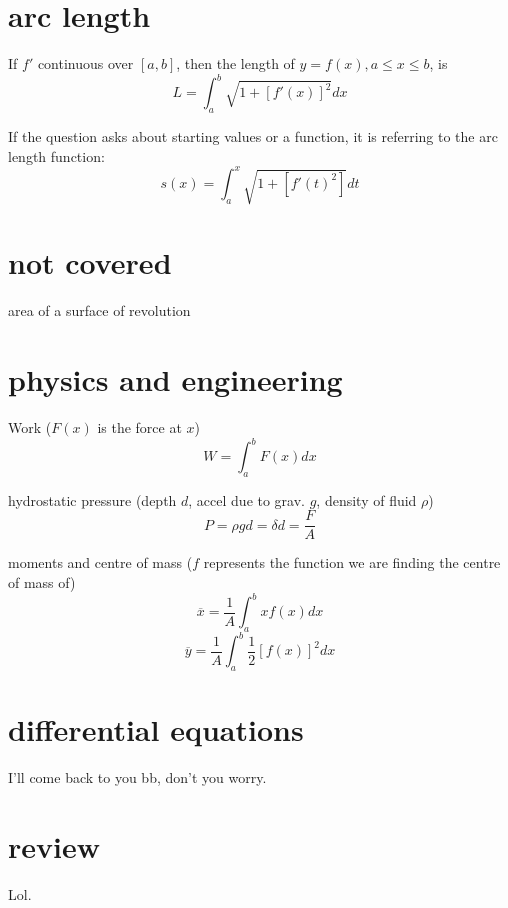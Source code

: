 \documentclass[10pt,a4paper]{report}
\begin{document}
\section{arc length}

If $f'$ continuous over $[a, b]$, then the length of $y = f(x), a \leq x \leq b$, is
$$
	L = \int_a^b \sqrt{1 + [f'(x)]^2} dx
$$

If the question asks about starting values or a function, it is referring to the arc length function:
$$
	s(x) = \int_a^x \sqrt{1 + [f'(t)^2]} dt
$$

\section{not covered}

area of a surface of revolution

\section{physics and engineering}

Work ($F(x)$ is the force at $x$)
$$
	W = \int_a^b F(x)dx
$$

\noindent hydrostatic pressure (depth $d$, accel due to grav. $g$, density of fluid $\rho$)
$$
	P = \rho g d = \delta d = \frac{F}{A}
$$

\noindent moments and centre of mass ($f$ represents the function we are finding the centre of mass of)
$$
	\overline{x} = \frac{1}{A} \int_a^b xf(x) dx
$$
$$
	\overline{y} = \frac{1}{A} \int_a^b \frac{1}{2}[f(x)]^2 dx
$$


\section{differential equations}

I'll come back to you bb, don't you worry.



\section*{review}

Lol.
\end{document}
